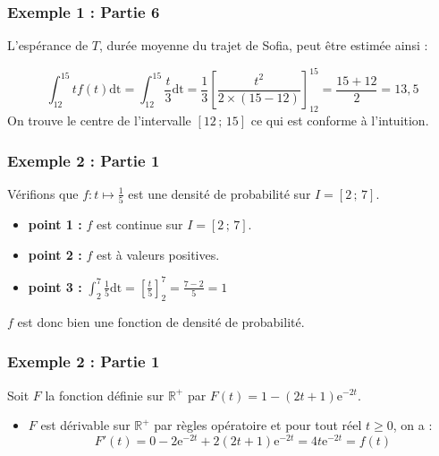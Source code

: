 \documentclass[xcolor=svgnames,t,final]{beamer}
\newcommand{\R}{\mathbb{R}}
\newcommand{\Interff}[2]{\left[#1\, ;\, #2\right]}
\begin{document}
\begin{frame}

\frametitle{Exemple 1 : Partie 6}






L'espérance de $T$, durée moyenne du trajet de Sofia, peut être estimée ainsi : 

\pause			\begin{equation*}
\int_{12}^{15}tf(t)\text{dt}=\int_{12}^{15}\frac{t}{3}\text{dt}=\frac{1}{3}\left[\frac{t^{2}}{2 \times (15-12)}\right]_{12}^{15}=\frac{15+12}{2} = 13,5 
		\end{equation*}
On trouve le centre de l'intervalle $\Interff{12}{15}$ ce qui est conforme à l'intuition.



\end{frame}

\begin{frame}

\frametitle{Exemple 2 : Partie 1}

Vérifions que $f: t \mapsto \frac{1}{5}$ est une densité de probabilité sur $I=\Interff{2}{7}$.

\begin{itemize}
\pause \item \textbf{point 1 :} $f$ est continue sur $I=\Interff{2}{7}$.



\pause \item \textbf{point 2 :} $f$ est à valeurs positives.

\pause \item \textbf{point 3 :} $\int_{2}^{7}\frac{1}{5}\text{dt} = \left[\frac{t}{5}  \right]_{2}^{7}=\frac{7-2}{5}=1$

\end{itemize}

$f$ est donc bien une fonction de densité de probabilité.


\end{frame}

\begin{frame}

\frametitle{Exemple 2 : Partie 1}

 Soit $F$ la fonction définie sur $\R^{+}$ par $F(t)=1-(2t+1)\text{e}^{-2t}$.
 
\begin{itemize}
\pause \item $F$ est dérivable sur $\R^{+}$ par règles opératoire et pour tout réel $t \geqslant 0$, on a :
\begin{equation*}
F'(t)=0-2\text{e}^{-2t}+2(2t+1)\text{e}^{-2t}=4t\text{e}^{-2t}=f(t)
\end{equation*}



\end{itemize}


\end{frame}
\end{document}
